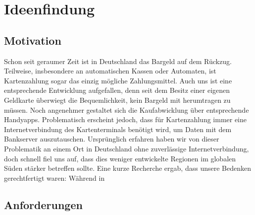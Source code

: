 \chapter{Ideenfindung}\label{ch:einleitung}
    \section{Motivation}
    Schon seit geraumer Zeit ist in Deutschland das Bargeld auf dem Rückzug.
    Teilweise, insbesondere an automatischen Kassen oder Automaten, ist Kartenzahlung sogar das einzig mögliche Zahlungsmittel.
    Auch uns ist eine entsprechende Entwicklung aufgefallen, denn seit dem Besitz einer eigenen Geldkarte überwiegt die Bequemlichkeit, kein Bargeld mit herumtragen zu müssen.
    Noch angenehmer gestaltet sich die Kaufabwicklung über entsprechende Handyapps.
    Problematisch erscheint jedoch, dass für Kartenzahlung immer eine Internetverbindung des Kartenterminals benötigt wird, um Daten mit dem Bankserver auszutauschen.
    Ursprünglich erfahren haben wir von dieser Problematik an einem Ort in Deutschland ohne zuverlässige Internetverbindung, doch schnell fiel uns auf, dass dies weniger entwickelte Regionen im globalen Süden stärker betreffen sollte.
    Eine kurze Recherche ergab, dass unsere Bedenken gerechtfertigt waren:
    Während in

    \section{Anforderungen}
